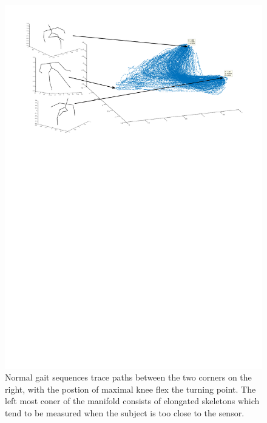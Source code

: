 \documentclass[11pt]{article} %
\begin{document}
\begin{figure}
\centering
\includegraphics*[trim={1cm 18cm 1cm 1cm},clip,width=0.96\linewidth,clip]{skelToManifod} 
\caption{Normal gait sequences trace paths between the two corners on the right, with the postion of maximal knee flex the turning point. The left most coner of the manifold consists of elongated skeletons which tend to be measured when the subject is too close to the sensor. }
\label{fig:skelToManifod}
\end{figure}
\end{document}
